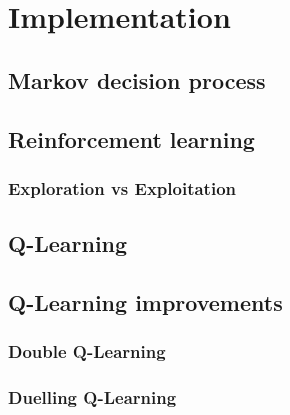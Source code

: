 \chapter{Implementation}
\section{Markov decision process}
\label{dsgn:sec:mdp}


\section{Reinforcement learning}
\label{dsgn:sec:rl}

\subsection{Exploration vs Exploitation}
\label{dsgn:sec:rl:expt-v-explor}

\section{Q-Learning}
\label{dsgn:sec:qlearning}

\section{Q-Learning improvements}
\label{dsgn:sec:qlearning:qextra}

\subsection{Double Q-Learning}
\label{dsgn:sec:qlearning:doubledqn}

\subsection{Duelling Q-Learning}
\label{dsgn:sec:qlearning:dueldqn}

